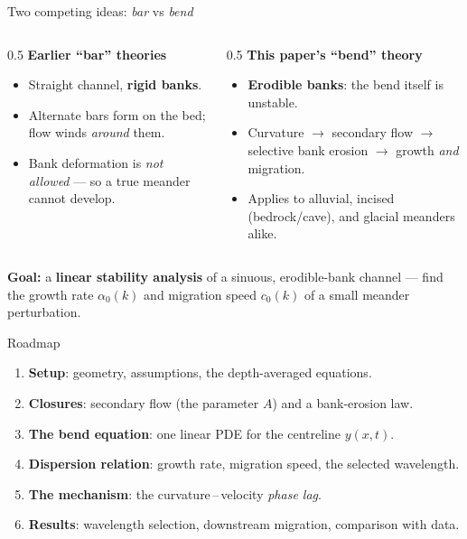 \documentclass[aspectratio=169,10pt]{beamer}
\newcommand{\hl}[2]{\textcolor{#1}{\textbf{#2}}}
\begin{document}
\begin{frame}{Two competing ideas: \emph{bar} vs \emph{bend}}
  \begin{columns}[T]
    \begin{column}{0.5\textwidth}
      \textbf{Earlier ``bar'' theories}
      \begin{itemize}
        \item Straight channel, \hl{cBank}{rigid banks}.
        \item Alternate bars form on the bed; flow winds \emph{around} them.
        \item Bank deformation is \emph{not allowed} --- so a true meander cannot develop.
      \end{itemize}
    \end{column}
    \begin{column}{0.5\textwidth}
      \textbf{This paper's ``bend'' theory}
      \begin{itemize}
        \item \hl{cGrowth}{Erodible banks}: the bend itself is unstable.
        \item Curvature $\to$ secondary flow $\to$ selective bank erosion $\to$ growth \emph{and} migration.
        \item Applies to alluvial, incised (bedrock/cave), and glacial meanders alike.
      \end{itemize}
    \end{column}
  \end{columns}
  \vfill
  \centering
  \colorbox{cChannel!10}{\parbox{0.9\linewidth}{\centering
  \textbf{Goal:} a \hl{cChannel}{linear stability analysis} of a sinuous, erodible-bank channel ---
  find the growth rate $\alpha_0(k)$ and migration speed $c_0(k)$ of a small meander perturbation.}}
\end{frame}

\begin{frame}{Roadmap}
  \begin{enumerate}
    \item \textbf{Setup}: geometry, assumptions, the depth-averaged equations.
    \item \textbf{Closures}: secondary flow (the parameter $A$) and a bank-erosion law.
    \item \textbf{The bend equation}: one linear PDE for the centreline $y(x,t)$.
    \item \textbf{Dispersion relation}: growth rate, migration speed, the selected wavelength.
    \item \hl{cEros}{The mechanism}: the curvature\,--\,velocity \emph{phase lag}.
    \item \textbf{Results}: wavelength selection, downstream migration, comparison with data.
  \end{enumerate}
\end{frame}
\end{document}
